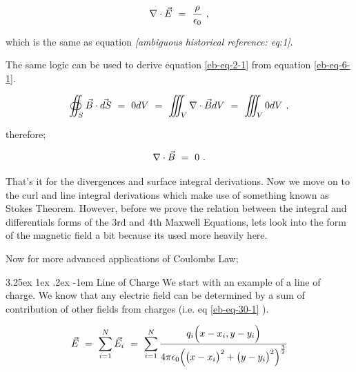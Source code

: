 \documentclass{article}
\makeatletter
\newcounter{subsubsubsection}[subsubsection]
\renewcommand\subparagraph{\@startsection{subparagraph}{6}{\parindent}%
  {3.25ex \@plus1ex \@minus .2ex}%
  {-1em}%
  {\normalfont\normalsize\bfseries}}
\makeatother
\begin{document}
\begin{equation} \label{eb-eq-27-1}
\nabla\cdot\vec{E} \hspace{0.125cm} = \hspace{0.125cm} \frac{\rho}{\epsilon_{0}} \hspace{0.125cm} , 
\end{equation}

which is the same as equation \textit{[ambiguous historical reference: eq:1]}. 

The same logic can be used to derive equation \ref{eb-eq-2-1} from equation \ref{eb-eq-6-1}.

\begin{equation} \label{eb-eq-28-1}
\oiint_S \vec{B}\cdot\vec{dS} \hspace{0.125cm} = \hspace{0.125cm} 0dV \hspace{0.125cm} = \hspace{0.125cm} \iiint_V \nabla\cdot\vec{B}dV \hspace{0.125cm} = \hspace{0.125cm} \iiint_V 0dV \hspace{0.125cm} , 
\end{equation}

therefore;

\begin{equation} \label{eb-eq-29-1}
\nabla\cdot\vec{B} \hspace{0.125cm} = \hspace{0.125cm} 0 \hspace{0.125cm} .
\end{equation}

That's it for the divergences and surface integral derivations. Now we move on to the curl and line integral derivations which make use of something known as Stokes Theorem. However, before we prove the relation between the integral and differentials forms of the 3rd and 4th Maxwell Equations, lets look into the form of the magnetic field a bit because its used more heavily here.

Now for more advanced applications of Coulombs Law;

\subparagraph{Line of Charge}
We start with an example of a line of charge. We know that any electric field can be determined by a sum of contribution of other fields from charges (i.e. eq \ref{eb-eq-30-1} ).

\begin{equation} \label{eb-eq-30-1}
\vec{E} \hspace{0.125cm} = \hspace{0.125cm} \sum_{i=1}^{N} \vec{E_{i}} \hspace{0.125cm} = \hspace{0.125cm} \sum_{i=1}^{N} \frac{q_{i}\Big(x - x_{i} , y - y_{i} \Big)}{4\pi \epsilon_{0} \Big( \big(x - x_{i}\big)^2 + \big(y - y_{i}\big)^2 \Big)^{\frac{3}{2}}}
\end{equation}
\end{document}
